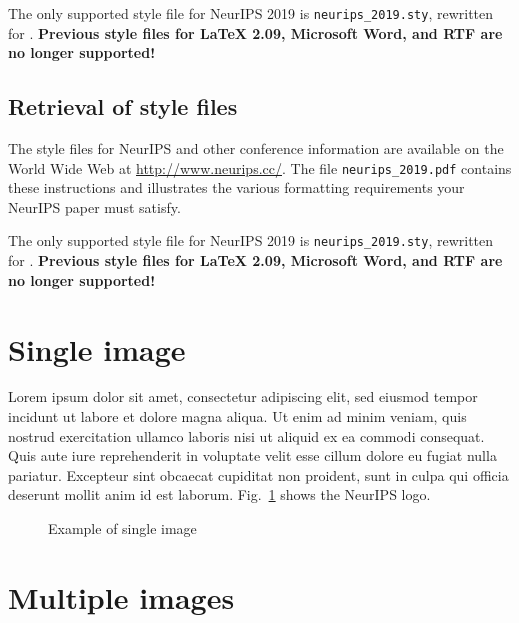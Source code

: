 \documentclass{article}
\begin{document}
The only supported style file for NeurIPS 2019 is \verb+neurips_2019.sty+, rewritten for \LaTeXe{}. \textbf{Previous style files for \LaTeX{} 2.09,  Microsoft Word, and RTF are no longer supported!}


\subsection{Retrieval of style files}

The style files for NeurIPS and other conference information are available on the World Wide Web at  \url{http://www.neurips.cc/}. The file \verb+neurips_2019.pdf+ contains these instructions and illustrates the various formatting requirements your NeurIPS paper must satisfy.

The only supported style file for NeurIPS 2019 is \verb+neurips_2019.sty+, rewritten for \LaTeXe{}. \textbf{Previous style files for \LaTeX{} 2.09,  Microsoft Word, and RTF are no longer supported!}



\section{Single image}

Lorem ipsum dolor sit amet, consectetur adipiscing elit, sed eiusmod tempor incidunt ut labore et dolore magna aliqua. Ut enim ad minim veniam, quis nostrud exercitation ullamco laboris nisi ut aliquid ex ea commodi consequat. Quis aute iure reprehenderit in voluptate velit esse cillum dolore eu fugiat nulla pariatur. Excepteur sint obcaecat cupiditat non proident, sunt in culpa qui officia deserunt mollit anim id est laborum. Fig.~\ref{image1} shows the NeurIPS logo.


\begin{figure}[H]
  \caption{Example of single image}
  \label{image1}
\end{figure}



\section{Multiple images}
\end{document}
